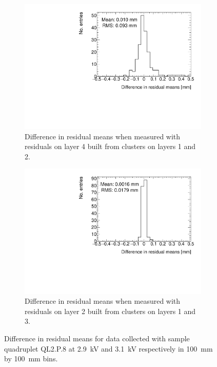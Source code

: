 \begin{figure}
\centering
\begin{subfigure}{.45\textwidth}
  \centering
  \includegraphics[width=0.97\linewidth]{figures/figure_compare_residual_fits_QL2P08_2900V_2021-05-21_minus_QL2P08_3100V_2021-05-21_layer4_fixedlayers12_mean_differences.pdf}
  \caption{Difference in residual means when measured with residuals on layer 4 built from clusters on layers 1 and 2.}
  \label{fig:voltage_compare_fits_412}
\end{subfigure}\hfill
\begin{subfigure}{.45\textwidth}
  \centering
  \includegraphics[width=0.97\linewidth]{figures/figure_compare_residual_fits_QL2P08_2900V_2021-05-21_minus_QL2P08_3100V_2021-05-21_layer2_fixedlayers13_mean_differences.pdf}
  \caption{Difference in residual means when measured with residuals on layer 2 built from clusters on layers 1 and 3.}
  \label{fig:voltage_compare_fits_213}
\end{subfigure}\hfill
\caption{Difference in residual means for data collected with sample quadruplet QL2.P.8 at 2.9~kV and 3.1~kV respectively in \SI{100}{\milli\meter} by \SI{100}{\milli\meter} bins.}
\label{fig:voltage_compare_fits}
\end{figure}

